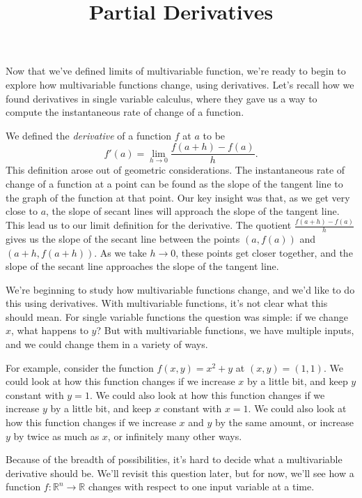\documentclass{ximera}
\title{Partial Derivatives}
\begin{document}
\begin{abstract}
\end{abstract}
\maketitle

Now that we've defined limits of multivariable function, we're ready to begin to explore how multivariable functions change, using derivatives. Let's recall how we found derivatives in single variable calculus, where they gave us a way to compute the instantaneous rate of change of a function.

We defined the \emph{derivative} of a function $f$ at $a$ to be
\[
f'(a) = \lim_{h\rightarrow 0}\frac{f(a+h)-f(a)}{h}.
\]
This definition arose out of geometric considerations. The instantaneous rate of change of a function at a point can be found as the slope of the tangent line to the graph of the function at that point. Our key insight was that, as we get very close to $a$, the slope of secant lines will approach the slope of the tangent line. This lead us to our limit definition for the derivative. The quotient $\frac{f(a+h)-f(a)}{h}$ gives us the slope of the secant line between the points $(a,f(a))$ and $(a+h, f(a+h))$. As we take $h\rightarrow 0$, these points get closer together, and the slope of the secant line approaches the slope of the tangent line.


We're beginning to study how multivariable functions change, and we'd like to do this using derivatives. With multivariable functions, it's not clear what this should mean. For single variable functions the question was simple: if we change $x$, what happens to $y$? But with multivariable functions, we have multiple inputs, and we could change them in a variety of ways.

For example, consider the function $f(x,y) = x^2+y$ at $(x,y)=(1,1)$. We could look at how this function changes if we increase $x$ by a little bit, and keep $y$ constant with $y=1$. We could also look at how this function changes if we increase $y$ by a little bit, and keep $x$ constant with $x=1$. We could also look at how this function changes if we increase $x$ and $y$ by the same amount, or increase $y$ by twice as much as $x$, or infinitely many other ways.

Because of the breadth of possibilities, it's hard to decide what a multivariable derivative should be. We'll revisit this question later, but for now, we'll see how a function $f:\mathbb{R}^n\rightarrow \mathbb{R}$ changes with respect to one input variable at a time.
\end{document}
